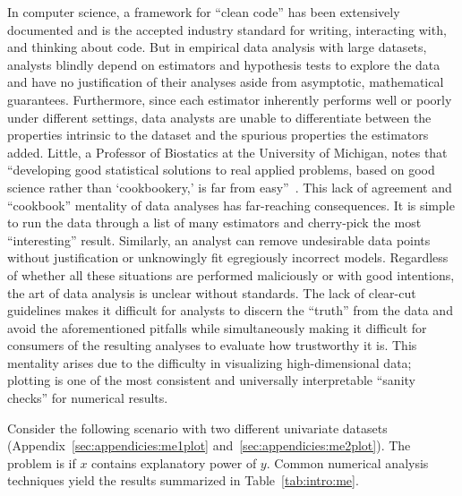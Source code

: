 In computer science, a framework for ``clean code'' has been extensively documented and is the accepted industry standard for writing, interacting with, and thinking about code. But in empirical data analysis with large datasets, analysts blindly depend on estimators and hypothesis tests to explore the data and have no justification of their analyses aside from asymptotic, mathematical guarantees. Furthermore, since each estimator inherently performs well or poorly under different settings, data analysts are unable to differentiate between the properties intrinsic to the dataset and the spurious properties the estimators added. Little, a Professor of Biostatics at the University of Michigan, notes that ``developing good statistical solutions to real applied problems, based on good science rather than `cookbookery,' is far from easy''~\cite{little2013}. This lack of agreement and ``cookbook'' mentality of data analyses has far-reaching consequences. It is simple to run the data through a list of many estimators and cherry-pick the most ``interesting'' result. Similarly, an analyst can remove undesirable data points without justification or unknowingly fit egregiously incorrect models. Regardless of whether all these situations are performed maliciously or with good intentions, the art of data analysis is unclear without standards. The lack of clear-cut guidelines makes it difficult for analysts to discern the ``truth'' from the data and avoid the aforementioned pitfalls while simultaneously making it difficult for consumers of the resulting analyses to evaluate how trustworthy it is. This mentality arises due to the difficulty in visualizing high-dimensional data; plotting is one of the most consistent and universally interpretable ``sanity checks'' for numerical results.

Consider the following scenario with two different univariate datasets (Appendix~\ref{sec:appendicies:me1plot} and~\ref{sec:appendicies:me2plot}). The problem is if $x$ contains explanatory power of $y$. Common numerical analysis techniques yield the results summarized in Table~\ref{tab:intro:me}.

\tablespacing

